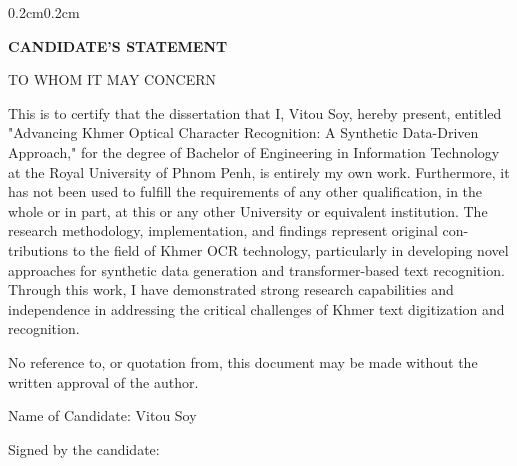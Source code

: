 \begin{adjustwidth}{0.2cm}{0.2cm}

\begin{center}
    {\englishfont\fontsize{14pt}{21pt}\selectfont \textbf{CANDIDATE'S STATEMENT} \par}
\end{center}
\label{candidate-statement}

\vspace{0.2cm}
\setlength{\parindent}{0pt}
\vspace{0.3cm}

{\englishfont\fontsize{13.5pt}{17pt}\selectfont \setlength{\parindent}{0pt} TO WHOM IT MAY CONCERN \par}

\vspace{0.5cm}
    \setlength{\parindent}{0pt}\englishfont\fontsize{13.5pt}{17pt}\selectfont 
    {\large This is to certify that the dissertation that I, Vitou Soy, hereby present, entitled "Advancing
    Khmer Optical Character Recognition: A Synthetic Data-Driven Approach," for the degree
    of Bachelor of Engineering in Information Technology at the Royal University of Phnom Penh, is
    entirely my own work. Furthermore, it has not been used to fulfill the requirements of any
    other qualification, in the whole or in part, at this or any other University or equivalent
    institution. The research methodology, implementation, and findings represent original con-
    tributions to the field of Khmer OCR technology, particularly in developing novel approaches
    for synthetic data generation and transformer-based text recognition. Through this work, I
    have demonstrated strong research capabilities and independence in addressing the critical
    challenges of Khmer text digitization and recognition.\par}

    \vspace{0.5cm}
    \setlength{\parindent}{0pt}
    {\large No reference to, or quotation from, this document may be made without the written
    approval of the author.\par}
    \vspace{0.5cm}
    \setlength{\parindent}{0pt}
    {\large Name of Candidate: Vitou Soy\par}
    
    \vspace{-0.1cm}
    \setlength{\parindent}{0pt}
    {\large Signed by the candidate: \dotfill\par}
    

\end{adjustwidth}
